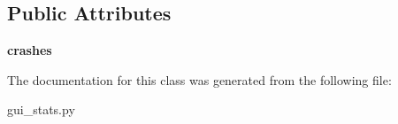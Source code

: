 \subsection*{Public Attributes}
\begin{DoxyCompactItemize}
\item 
\mbox{\label{classgui__stats_1_1_rollup_model_aac18269ac34f7b216df1c46d49c8a464}} 
{\bfseries crashes}
\end{DoxyCompactItemize}


The documentation for this class was generated from the following file\+:\begin{DoxyCompactItemize}
\item 
gui\+\_\+stats.\+py\end{DoxyCompactItemize}
